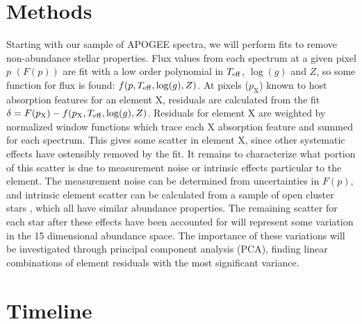 \documentclass[preprint]{aastex}
\begin{document}
\section{Methods}
\label{sec:methods}
Starting with our sample of APOGEE spectra, we will perform fits to remove non-abundance stellar properties. Flux values from each spectrum at a given pixel $p$ $(F(p))$ are fit with a low order polynomial in $T_{\rm eff}$, $\log(g)$ and $Z$, so some function for flux is found: $f(p,T_{\rm eff},\log(g),Z)$. At pixels ($p_\mathrm{X}$) known to host absorption features for an element X, residuals are calculated from the fit $\delta = F(p_\mathrm{X}) - f(p_\mathrm{X},T_{\rm eff},\log(g),Z)$. Residuals for element X are weighted by normalized window functions which trace each X absorption feature and summed for each spectrum. This gives some scatter in element X, since other systematic effects have ostensibly removed by the fit. It remains to characterize what portion of this scatter is due to measurement noise or intrinsic effects particular to the element. The measurement noise can be determined from uncertainties in $F(p)$, and intrinsic element scatter can be calculated from a sample of open cluster stars \citep{meszaros2015}, which all have similar abundance properties. The remaining scatter for each star after these effects have been accounted for will represent some variation in the 15 dimensional abundance space. The importance of these variations will be investigated through principal component analysis (PCA), finding linear combinations of element residuals with the most significant variance.

\section{Timeline}
\label{sec:timeline}
\end{document}
